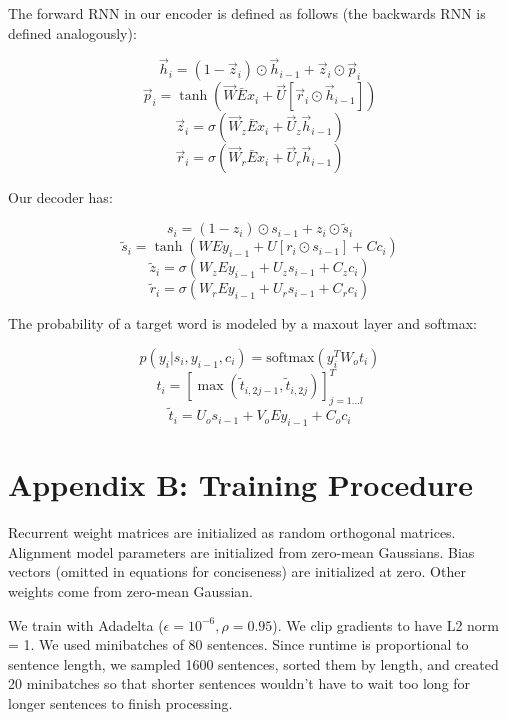 \documentclass[a4paper]{article}
\begin{document}
The forward RNN in our encoder is defined as follows (the backwards RNN is
defined analogously):

$$
\overrightarrow{h}_i = (1 - \overrightarrow{z}_i) \odot
\overrightarrow{h}_{i-1} + \overrightarrow{z}_i \odot \overrightarrow{p}_i
$$
$$
\overrightarrow{p}_i = \tanh{(\overrightarrow{W} \bar{E} x_i +
\overrightarrow{U}[\overrightarrow{r}_i \odot \overrightarrow{h}_{i-1}])}
$$
$$
\overrightarrow{z}_i = \sigma{(\overrightarrow{W}_z \bar{E} x_i +
\overrightarrow{U}_z \overrightarrow{h}_{i-1})}
$$
$$
\overrightarrow{r}_i = \sigma{(\overrightarrow{W}_r \bar{E} x_i +
\overrightarrow{U}_r \overrightarrow{h}_{i-1})}
$$

Our decoder has:

$$
s_i = (1 - z_i) \odot s_{i-1} + z_i \odot \tilde{s}_i
$$
$$
\tilde{s}_i = \tanh{(W E y_{i-1} + U[r_i \odot s_{i-1}] + C c_i)}
$$
$$
\tilde{z}_i = \sigma{(W_z E y_{i-1} + U_z s_{i-1} + C_z c_i)}
$$
$$
\tilde{r}_i = \sigma{(W_r E y_{i-1} + U_r s_{i-1} + C_r c_i)}
$$

The probability of a target word is modeled by a maxout layer and softmax:

$$
p(y_i | s_i, y_{i-1}, c_i) = \text{softmax}{(y_i^T W_o t_i)}
$$
$$
t_i = [\max{(\tilde{t}_{i, 2j - 1}, \tilde{t}_{i, 2j})}]_{j=1...l}^T
$$
$$
\tilde{t}_i = U_o s_{i-1} + V_o E y_{i-1} + C_o c_i
$$

\section{Appendix B: Training Procedure}
Recurrent weight matrices are initialized as random orthogonal matrices.
Alignment model parameters are initialized from zero-mean Gaussians. Bias
vectors (omitted in equations for conciseness) are initialized at zero. Other
weights come from zero-mean Gaussian.

We train with Adadelta ($\epsilon = 10^{-6}, \rho = 0.95$). We clip gradients to
have L2 norm = 1. We used minibatches of 80 sentences. Since runtime is
proportional to sentence length, we sampled 1600 sentences, sorted them by
length, and created 20 minibatches so that shorter sentences wouldn't have to
wait too long for longer sentences to finish processing.
\end{document}
